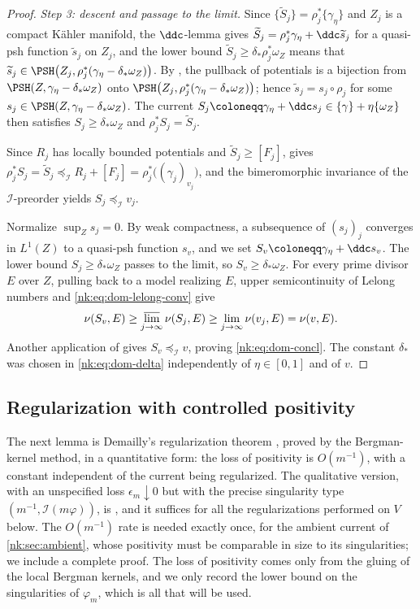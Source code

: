 \begin{proof}
\emph{Step 3: descent and passage to the limit.}
Since $\{\widetilde S_j\}=\rho_j^*\{\gamma_\eta\}$ and $Z_j$ is a
compact K\"ahler manifold, the $\ddc$-lemma gives
$\widetilde S_j=\rho_j^*\gamma_\eta+\ddc\widetilde s_j$ for a quasi-psh
function $\widetilde s_j$ on $Z_j$, and the lower bound
$\widetilde S_j\ge\delta_*\rho_j^*\omega_Z$ means that
$\widetilde s_j\in
\PSH\bigl(Z_j,\rho_j^*(\gamma_\eta-\delta_*\omega_Z)\bigr)$. By
\cite[Proposition~1.5.3]{SGPT}, the pullback of potentials is a
bijection from $\PSH(Z,\gamma_\eta-\delta_*\omega_Z)$ onto
$\PSH\bigl(Z_j,\rho_j^*(\gamma_\eta-\delta_*\omega_Z)\bigr)$; hence
$\widetilde s_j=s_j\circ\rho_j$ for some
$s_j\in\PSH(Z,\gamma_\eta-\delta_*\omega_Z)$. The current
$S_j\coloneqq \gamma_\eta+\ddc s_j\in\{\gamma\}+\eta\{\omega_Z\}$ then
satisfies
$S_j\ge\delta_*\omega_Z$ and $\rho_j^*S_j=\widetilde S_j$.

Since $R_j$ has locally bounded potentials and
$\widetilde S_j\ge[F_j]$, \cite[Proposition~6.1.2]{SGPT} gives
$\rho_j^*S_j=\widetilde S_j
\preceq_{\mathcal I} R_j+[F_j]=\rho_j^*\bigl((\gamma_j)_{v_j}\bigr)$, and the
bimeromorphic invariance of the $\mathcal I$-preorder
\cite[Lemma~6.1.4]{SGPT} yields $S_j\preceq_{\mathcal I} v_j$.

Normalize $\sup_Zs_j=0$. By weak compactness, a subsequence of
$(s_j)_j$ converges in $L^1(Z)$ to a quasi-psh function $s_v$, and
we set $S_v\coloneqq \gamma_\eta+\ddc s_v$. The lower bound
$S_j\ge\delta_*\omega_Z$ passes to the limit, so
$S_v\ge\delta_*\omega_Z$. For every prime divisor $E$ over $Z$,
pulling back to a model realizing $E$, upper semicontinuity of
Lelong numbers and \eqref{nk:eq:dom-lelong-conv} give
\[
  \nu(S_v,E)\ge\varlimsup_{j\to\infty}\nu(S_j,E)
  \ge\lim_{j\to\infty}\nu(v_j,E)=\nu(v,E).
\]
Another application of \cite[Proposition~6.1.2]{SGPT} gives
$S_v\preceq_{\mathcal I} v$, proving \eqref{nk:eq:dom-concl}. The constant $\delta_*$ was chosen in
\eqref{nk:eq:dom-delta} independently of $\eta\in[0,1]$ and of $v$.
\end{proof}

\subsection{Regularization with controlled positivity}

The next lemma is Demailly's regularization theorem \cite{Dem92,DPS01},
proved by the Bergman-kernel method, in a quantitative form: the loss of
positivity is $O(m^{-1})$, with a constant independent of the current
being regularized. The qualitative version, with an unspecified loss
$\epsilon_m\downarrow0$ but with the precise singularity type
$(m^{-1},\mathcal I(m\varphi))$, is \cite[Theorem~1.6.2]{SGPT}, and it
suffices for all the regularizations performed on $V$ below. The
$O(m^{-1})$ rate is needed exactly once, for the ambient current of
\cref{nk:sec:ambient}, whose positivity must be comparable in size to its
singularities; we include a complete proof. The loss of positivity comes only from
the gluing of the local Bergman kernels, and we only record the lower
bound on the singularities of $\varphi_m$, which is all that will be
used.

